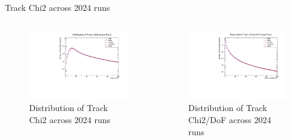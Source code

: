 \begin{frame}{Track Chi2 across 2024 runs}
	\begin{columns}
		\begin{column}{0.5 \linewidth}
			\begin{figure}
				\includegraphics[width=\linewidth]{./RunwisePlots/Track_Chi2_runwise.pdf}
				\caption{Distribution of Track Chi2 across 2024 runs}
			\end{figure}
		\end{column}
		\begin{column}{0.5 \linewidth}
			\begin{figure}
				\includegraphics[width=\linewidth]{./RunwisePlots/Track_Chi2perDoF_runwise.pdf}
				\caption{Distribution of Track Chi2/DoF across 2024 runs}
			\end{figure}
		\end{column}
	\end{columns}
\end{frame}

